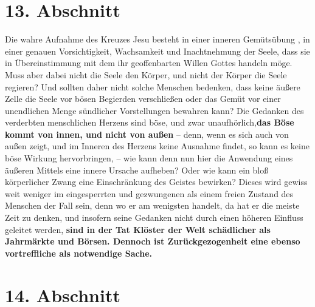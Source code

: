 \section{13. Abschnitt} \label{kap5_ab13}

Die wahre Aufnahme des Kreuzes Jesu besteht in einer inneren Gemütsübung
, in
einer genauen Vorsichtigkeit, Wachsamkeit und Inachtnehmung der Seele, dass sie
in Übereinstimmung mit dem ihr geoffenbarten Willen Gottes
 handeln möge. Muss
aber dabei nicht die Seele den Körper, und nicht der Körper die Seele regieren?
Und sollten daher nicht solche Menschen bedenken, dass keine äußere Zelle die
Seele vor bösen Begierden verschließen oder das Gemüt vor einer unendlichen
Menge sündlicher Vorstellungen bewahren kann? Die Gedanken des verderbten
menschlichen Herzens sind böse, und zwar unaufhörlich,\textbf{das Böse kommt von
innen,
und nicht von außen} -- denn, wenn es sich auch von außen zeigt, und im Inneren
des Herzens keine Ausnahme findet, so kann es keine böse Wirkung hervorbringen,
-- wie kann denn nun hier die Anwendung eines äußeren Mittels eine innere
Ursache
aufheben? Oder wie kann ein bloß körperlicher Zwang eine Einschränkung des
Geistes bewirken? Dieses wird gewiss weit weniger im eingesperrten und
gezwungenen als einem freien Zustand des Menschen der Fall sein, denn wo er am
wenigsten handelt, da hat er die meiste Zeit zu denken, und insofern seine
Gedanken nicht durch einen höheren Einfluss geleitet werden,
\label{ref:05_13_zurueckgezogenheit} \textbf{sind in der Tat
Klöster der Welt schädlicher als Jahrmärkte und Börsen. Dennoch ist
Zurückgezogenheit eine ebenso vortreffliche als notwendige Sache.}

\section{14. Abschnitt} \label{kap5_ab14}

